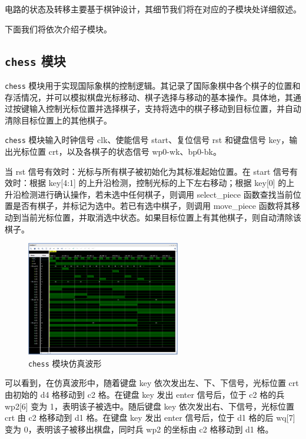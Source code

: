 \documentclass[a4paper, 12pt]{article}
\begin{document}
        电路的状态及转移主要基于棋钟设计，其细节我们将在对应的子模块处详细叙述。

        下面我们将依次介绍子模块。

        \subsection{\texttt{chess} 模块}

            \texttt{chess} 模块用于实现国际象棋的控制逻辑。其记录了国际象棋中各个棋子的位置和存活情况，并可以模拟棋盘光标移动、棋子选择与移动的基本操作。具体地，其通过按键输入控制光标位置并选择棋子，支持将选中的棋子移动到目标位置，并自动清除目标位置上的其他棋子。

            \texttt{chess} 模块输入时钟信号 clk、使能信号 start、复位信号 rst 和键盘信号 key，输出光标位置 crt，以及各棋子的状态信号 wp0-wk、bp0-bk。

            当 rst 信号有效时：光标与所有棋子被初始化为其标准起始位置。在 start 信号有效时：根据 key[4:1] 的上升沿检测，控制光标的上下左右移动；根据 key[0] 的上升沿检测进行确认操作，若未选中任何棋子，则调用 select\_piece 函数查找当前位置是否有棋子，并标记为选中。若已有选中棋子，则调用 move\_piece 函数将其移动到当前光标位置，并取消选中状态。如果目标位置上有其他棋子，则自动清除该棋子。

            \begin{figure}[H]
                \centering
                \includegraphics[width=0.6\textwidth]{wave0}
                \caption{\texttt{chess} 模块仿真波形}
            \end{figure}

            可以看到，在仿真波形中，随着键盘 key 依次发出左、下、下信号，光标位置 crt 由初始的 d4 格移动到 c2 格。在键盘 key 发出 enter 信号后，位于 c2 格的兵 wp2[6] 变为 1，表明该子被选中。随后键盘 key 依次发出右、下信号，光标位置 crt 由 c2 格移动到 d1 格。在键盘 key 发出 enter 信号后，位于 d1 格的后 wq[7] 变为 0，表明该子被移出棋盘，同时兵 wp2 的坐标由 c2 格移动到 d1 格。
\end{document}

